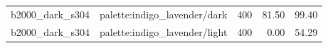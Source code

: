 \begin{longtable}{l>{\raggedright\arraybackslash}p{.42\linewidth}rrr}
b2000\_\allowbreak{}dark\_\allowbreak{}s304 & %
palette:indigo\_\allowbreak{}lavender/dark & %
400 & %
81.50 & %
99.40 \\ %

b2000\_\allowbreak{}dark\_\allowbreak{}s304 & %
palette:indigo\_\allowbreak{}lavender/light & %
400 & %
0.00 & %
54.29 \\ %


\end{longtable}
